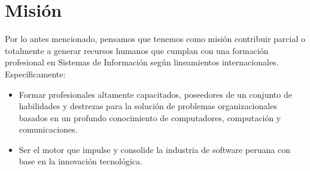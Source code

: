 \section{Misión}\label{sec:cs-mision}
Por lo antes mencionado, pensamos que tenemos como misión contribuir parcial o totalmente a generar recursos humanos 
que cumplan con una formación profesional en Sistemas de Información según lineamientos internacionales. Especí­ficamente:

\begin{itemize}
\item Formar profesionales altamente capacitados, poseedores de un conjunto de habilidades y destrezas para 
	la solución de problemas organizacionales basados en un profundo conocimiento de computadores, 
	computación y comunicaciones.
\item Ser el motor que impulse y consolide la industria de software peruana con base en la innovación 
	tecnológica.
\end{itemize}